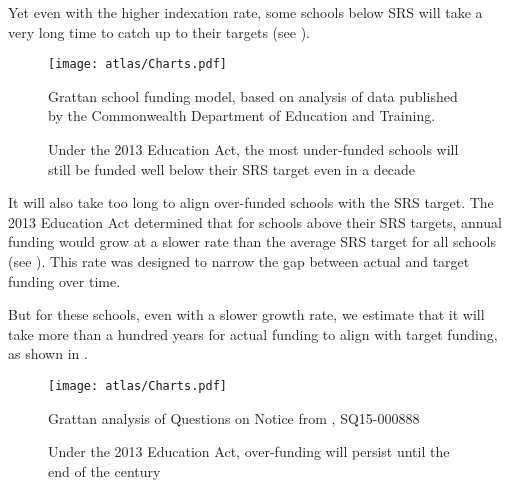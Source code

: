 \documentclass{grattan}
\begin{document}
Yet even with the higher indexation rate, some schools below SRS will take a very long time to catch up to their targets (see ).

\begin{figure}
\caption{Under the 2013 Education Act, the most under-funded schools will still be funded well below their SRS target even in a decade}\label{fig:some-underfunded-schools-still-below-target-even-in-a-decade}

\texttt{[image: atlas/Charts.pdf]}

{Grattan school funding model, based on analysis of data published by the Commonwealth Department of Education and Training.}
\end{figure}

It will also take too long to align over-funded schools with the SRS target.
The 2013 Education Act determined that for schools above their SRS targets, annual funding would grow at a slower rate than the average SRS target for all schools (see ).
This rate was designed to narrow the gap between actual and target funding over time.

But for these schools, even with a slower growth rate, we estimate that it will take more than a hundred years for actual funding to align with target funding, as shown in .

\begin{figure}
\caption{Under the 2013 Education Act, over-funding will persist until the end of the century\label{fig:overfunding-will-persist-until-end-of-century}}

\texttt{[image: atlas/Charts.pdf]}

%
{Grattan analysis of Questions on Notice from \textcite{SenateSQ15000888}, SQ15-000888}
\end{figure}
\afterpage{\cleardoublepage}
\oneraggedpage\pagebreak[4]
\end{document}
